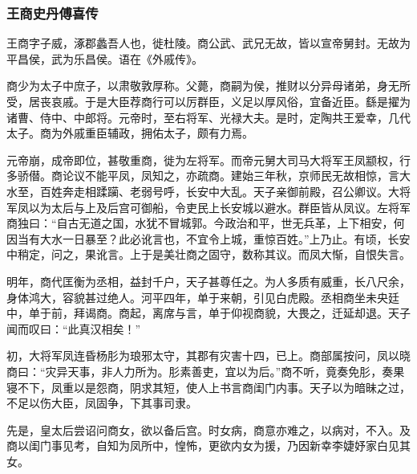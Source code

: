 \documentclass[]{article}
\begin{document}
\hypertarget{header-n5653}{%
\subsubsection{王商史丹傅喜传}\label{header-n5653}}

王商字子威，涿郡蠡吾人也，徙杜陵。商公武、武兄无故，皆以宣帝舅封。无故为平昌侯，武为乐昌侯。语在《外戚传》。

商少为太子中庶子，以肃敬敦厚称。父薨，商嗣为侯，推财以分异母诸弟，身无所受，居丧哀戚。于是大臣荐商行可以厉群臣，义足以厚风俗，宜备近臣。繇是擢为诸曹、侍中、中郎将。元帝时，至右将军、光禄大夫。是时，定陶共王爱幸，几代太子。商为外戚重臣辅政，拥佑太子，颇有力焉。

元帝崩，成帝即位，甚敬重商，徙为左将军。而帝元舅大司马大将军王凤颛权，行多骄僣。商论议不能平凤，凤知之，亦疏商。建始三年秋，京师民无故相惊，言大水至，百姓奔走相蹂躏、老弱号呼，长安中大乱。天子亲御前殿，召公卿议。大将军凤以为太后与上及后宫可御船，令吏民上长安城以避水。群臣皆从凤议。左将军商独曰：``自古无道之国，水犹不冒城郭。今政治和平，世无兵革，上下相安，何因当有大水一日暴至？此必讹言也，不宜令上城，重惊百姓。''上乃止。有顷，长安中稍定，问之，果讹言。上于是美壮商之固守，数称其议。而凤大惭，自恨失言。

明年，商代匡衡为丞相，益封千户，天子甚尊任之。为人多质有威重，长八尺余，身体鸿大，容貌甚过绝人。河平四年，单于来朝，引见白虎殿。丞相商坐未央廷中，单于前，拜谒商。商起，离席与言，单于仰视商貌，大畏之，迁延却退。天子闻而叹曰：``此真汉相矣！''

初，大将军凤连昏杨肜为琅邪太守，其郡有灾害十四，已上。商部属按问，凤以晓商曰：``灾异天事，非人力所为。肜素善吏，宜以为后。''商不听，竟奏免肜，奏果寝不下，凤重以是怨商，阴求其短，使人上书言商闺门内事。天子以为暗昧之过，不足以伤大臣，凤固争，下其事司隶。

先是，皇太后尝诏问商女，欲以备后宫。时女病，商意亦难之，以病对，不入。及商以闺门事见考，自知为凤所中，惶怖，更欲内女为援，乃因新幸李婕妤家白见其女。
\end{document}
